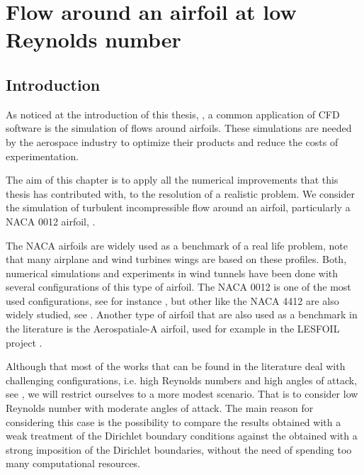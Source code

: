 \chapter{Flow around an airfoil at low Reynolds number}
\label{chap-NACA}

\section{Introduction}
\label{sec-C8_introduction}
As noticed at the introduction of this thesis, , a common application of CFD software is the simulation of flows around airfoils. These simulations are needed by the aerospace industry to optimize their products and reduce the costs of experimentation.

The aim of this chapter is to apply all the numerical improvements that this thesis has contributed with, to the resolution of a realistic problem. We consider the simulation of turbulent incompressible flow around an airfoil, particularly a NACA 0012 airfoil, \cite{jacobs_eastman_n_ward_kenneth_e_pinkerton_robert_m_characteristics_1933}.

The NACA airfoils are widely used as a benchmark of a real life problem, note that many airplane and wind turbines wings are based on these profiles. Both, numerical simulations and experiments in wind tunnels have been done with several configurations of this type of airfoil. The NACA 0012 is one of the most used configurations, see for instance \cite{sheldahl_aerodynamic_1981,mccroskey_w._j._critical_????,jose_rivera_naca_????}, but other like the NACA 4412 are also widely studied, see \cite{wadcock_investigation_1987,hastings_studies_1984}. Another type of airfoil that are also used as a benchmark in the literature is the Aerospatiale-A airfoil, used for example in the LESFOIL project \cite{davidson_lesfoil:_2012}.

Although that most of the works that can be found in the literature deal with challenging configurations, i.e. high Reynolds numbers and high angles of attack, see \cite{jansen_stabilized_1999, kaltenbach_large-eddy_1995, schmidt_assessment_????,mellen_lessons_2003}, we will restrict ourselves to a more modest scenario. That is to consider low Reynolds number with moderate angles of attack. The main reason for considering this case is the possibility to compare the results obtained with a weak treatment of the Dirichlet boundary conditions against the obtained with a strong imposition of the Dirichlet boundaries, without the need of spending too many computational resources.

